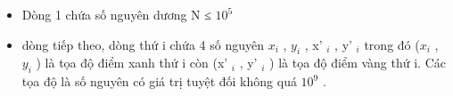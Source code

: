 \begin{itemize}
	\item     Dòng 1 chứa số nguyên dương N ≤ $10^{5}$
	\item     dòng tiếp theo, dòng thứ i chứa 4 số nguyên $x_{i}$    , $y_{i}$    , x'    $_     i    $    , y'    $_     i    $    trong đó ($x_{i}$    , $y_{i}$    ) là tọa độ điểm xanh thứ i còn (x'    $_     i    $    , y'    $_     i    $    ) là tọa độ điểm vàng thứ i. Các tọa độ là số nguyên có giá trị tuyệt đối không quá $10^{9}$    .   
\end{itemize}